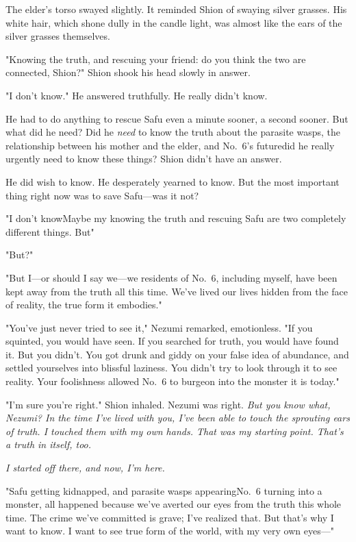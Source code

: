 The elder's torso swayed slightly. It reminded Shion of swaying silver
grasses. His white hair, which shone dully in the candle light, was
almost like the ears of the silver grasses themselves.

"Knowing the truth, and rescuing your friend: do you think the two are
connected, Shion?" Shion shook his head slowly in answer.

"I don't know." He answered truthfully. He really didn't know.

He had to do anything to rescue Safu even a minute sooner, a second
sooner. But what did he need? Did he \emph{need} to know the truth about the
parasite wasps, the relationship between his mother and the elder, and
No.~6's future\el did he really urgently need to know these things?
Shion didn't have an answer.

He did wish to know. He desperately yearned to know. But the most
important thing right now was to save Safu---was it not?

"I don't know\el Maybe my knowing the truth and rescuing Safu are two
completely different things. But\el "

"But?"

"But I---or should I say we---we residents of No.~6, including myself, have
been kept away from the truth all this time. We've lived our lives
hidden from the face of reality, the true form it embodies."

"You've just never tried to see it," Nezumi remarked, emotionless. "If
you squinted, you would have seen. If you searched for truth, you would
have found it. But you didn't. You got drunk and giddy on your false
idea of abundance, and settled yourselves into blissful laziness. You
didn't try to look through it to see reality. Your foolishness allowed
No.~6 to burgeon into the monster it is today."

"I'm sure you're right." Shion inhaled. Nezumi was right. \emph{But you know
what, Nezumi? In the time I've lived with you, I've been able to touch
the sprouting ears of truth. I touched them with my own hands. That was
my starting point. That's a truth in itself, too.}

\emph{I started off there, and now, I'm here.}

"Safu getting kidnapped, and parasite wasps appearing\el No.~6 turning
into a monster, all happened because we've averted our eyes from the
truth this whole time. The crime we've committed is grave; I've realized
that. But that's why I want to know. I want to see true form of the
world, with my very own eyes---"

